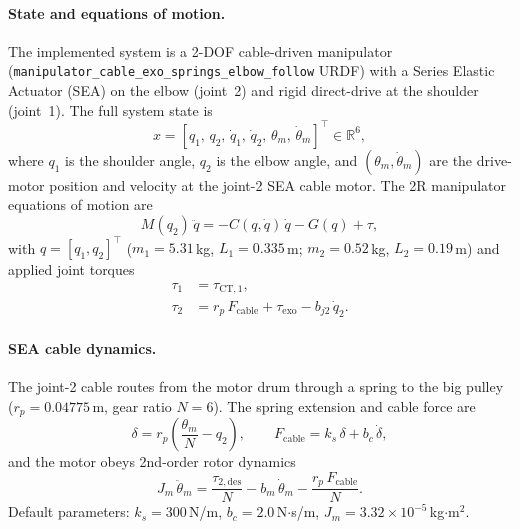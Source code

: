 \documentclass[11pt]{article}
\begin{document}
\paragraph{State and equations of motion.}
The implemented system is a 2-DOF cable-driven manipulator (\texttt{manipulator\_cable\_exo\_springs\_elbow\_follow} URDF) with a Series Elastic Actuator (SEA) on the elbow (joint~2) and rigid direct-drive at the shoulder (joint~1).  The full system state is
\begin{equation}
    x = [q_1,\, q_2,\, \dot{q}_1,\, \dot{q}_2,\, \theta_m,\, \dot{\theta}_m]^\top \in \mathbb{R}^6,
    \label{eq:state6d}
\end{equation}
where $q_1$ is the shoulder angle, $q_2$ is the elbow angle, and $(\theta_m, \dot{\theta}_m)$ are the drive-motor position and velocity at the joint-2 SEA cable motor.  The 2R manipulator equations of motion are
\begin{equation}
    M(q_2)\,\ddot{q} = -C(q,\dot{q})\,\dot{q} - G(q) + \tau,
    \label{eq:eom}
\end{equation}
with $q = [q_1, q_2]^\top$ ($m_1=5.31$\,kg, $L_1=0.335$\,m; $m_2=0.52$\,kg, $L_2=0.19$\,m) and applied joint torques
\begin{align}
    \tau_1 &= \tau_{\mathrm{CT},1},
    \label{eq:tau1} \\
    \tau_2 &= r_p\,F_{\mathrm{cable}} + \tau_{\mathrm{exo}} - b_{j2}\,\dot{q}_2 .
    \label{eq:tau2_full}
\end{align}

\paragraph{SEA cable dynamics.}
The joint-2 cable routes from the motor drum through a spring to the big pulley ($r_p = 0.04775$\,m, gear ratio $N=6$).  The spring extension and cable force are
\begin{equation}
    \delta = r_p\!\left(\frac{\theta_m}{N} - q_2\right),\qquad
    F_{\mathrm{cable}} = k_s\,\delta + b_c\,\dot{\delta},
    \label{eq:sea}
\end{equation}
and the motor obeys 2nd-order rotor dynamics
\begin{equation}
    J_m\,\ddot{\theta}_m = \frac{\tau_{2,\mathrm{des}}}{N} - b_m\,\dot{\theta}_m - \frac{r_p\,F_{\mathrm{cable}}}{N}.
    \label{eq:motor_ode}
\end{equation}
Default parameters: $k_s = 300$\,N/m, $b_c = 2.0$\,N$\cdot$s/m, $J_m = 3.32\times10^{-5}$\,kg$\cdot$m$^2$.
\end{document}
